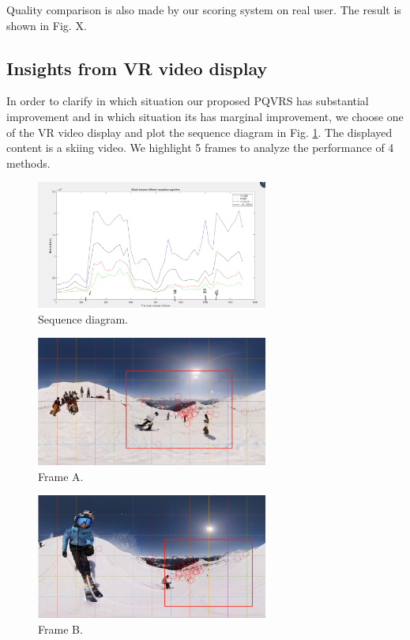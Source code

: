 Quality comparison is also made by our scoring system on real user. The result is shown in Fig. X.

\subsection{Insights from VR video display}

In order to clarify in which situation our proposed PQVRS has substantial improvement and in which situation its has marginal improvement, we choose one of the VR video display and plot the sequence diagram in Fig. \ref{sequence}. The displayed content is a skiing video. We highlight 5 frames to analyze the performance of 4 methods.

\begin{figure}
  \centering
  \includegraphics[width=3in]{images/sequence.png}
  \caption{Sequence diagram.}
  \label{sequence}
  \end{figure}

\begin{figure}
  \centering
  \includegraphics[width=3in]{images/case1.png}
  \caption{Frame A.}
  \label{referencename}
  \end{figure}
  
  \begin{figure}
  \centering
  \includegraphics[width=3in]{images/case2.png}
  \caption{Frame B.}
  \label{referencename}
  \end{figure}
  
